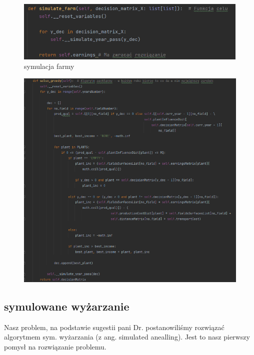 \documentclass[12pt,a4paper]{article}
\begin{document}
\begin{figure}[H]
	\centering
	\includegraphics[width=1\linewidth]{screens/stm_farmy}
	\caption{symulacja farmy}
	\label{fig:stmfarmy}
\end{figure}

\begin{figure}[H]
	\centering
	\includegraphics[width=1\linewidth]{screens/greedy}
	\caption{}
	\label{fig:greedy}
\end{figure}


\subsection{symulowane wyżarzanie}
 Nasz problem, na podstawie sugestii pani Dr. postanowiliśmy rozwiązać algorytmem sym. wyżarzania (z ang. simulated anealling). Jest to nasz pierwszy pomysł na rozwiązanie problemu.
\end{document}
